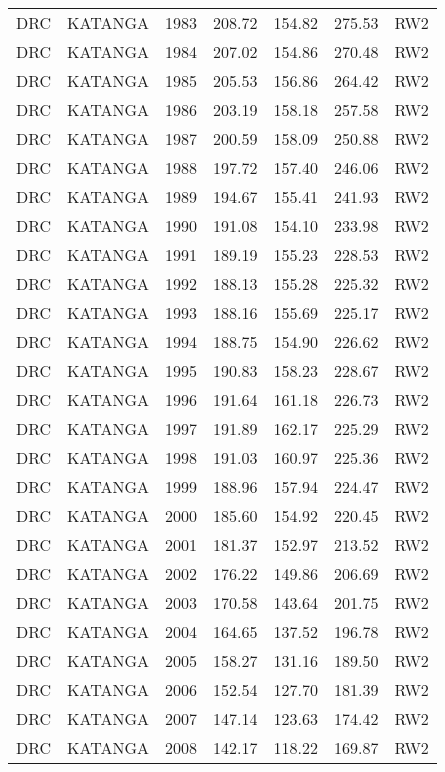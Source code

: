 \begin{longtable}{lllrrrl}
  DRC & KATANGA & 1983 & 208.72 & 154.82 & 275.53 & RW2 \\ 
  DRC & KATANGA & 1984 & 207.02 & 154.86 & 270.48 & RW2 \\ 
  DRC & KATANGA & 1985 & 205.53 & 156.86 & 264.42 & RW2 \\ 
  DRC & KATANGA & 1986 & 203.19 & 158.18 & 257.58 & RW2 \\ 
  DRC & KATANGA & 1987 & 200.59 & 158.09 & 250.88 & RW2 \\ 
  DRC & KATANGA & 1988 & 197.72 & 157.40 & 246.06 & RW2 \\ 
  DRC & KATANGA & 1989 & 194.67 & 155.41 & 241.93 & RW2 \\ 
  DRC & KATANGA & 1990 & 191.08 & 154.10 & 233.98 & RW2 \\ 
  DRC & KATANGA & 1991 & 189.19 & 155.23 & 228.53 & RW2 \\ 
  DRC & KATANGA & 1992 & 188.13 & 155.28 & 225.32 & RW2 \\ 
  DRC & KATANGA & 1993 & 188.16 & 155.69 & 225.17 & RW2 \\ 
  DRC & KATANGA & 1994 & 188.75 & 154.90 & 226.62 & RW2 \\ 
  DRC & KATANGA & 1995 & 190.83 & 158.23 & 228.67 & RW2 \\ 
  DRC & KATANGA & 1996 & 191.64 & 161.18 & 226.73 & RW2 \\ 
  DRC & KATANGA & 1997 & 191.89 & 162.17 & 225.29 & RW2 \\ 
  DRC & KATANGA & 1998 & 191.03 & 160.97 & 225.36 & RW2 \\ 
  DRC & KATANGA & 1999 & 188.96 & 157.94 & 224.47 & RW2 \\ 
  DRC & KATANGA & 2000 & 185.60 & 154.92 & 220.45 & RW2 \\ 
  DRC & KATANGA & 2001 & 181.37 & 152.97 & 213.52 & RW2 \\ 
  DRC & KATANGA & 2002 & 176.22 & 149.86 & 206.69 & RW2 \\ 
  DRC & KATANGA & 2003 & 170.58 & 143.64 & 201.75 & RW2 \\ 
  DRC & KATANGA & 2004 & 164.65 & 137.52 & 196.78 & RW2 \\ 
  DRC & KATANGA & 2005 & 158.27 & 131.16 & 189.50 & RW2 \\ 
  DRC & KATANGA & 2006 & 152.54 & 127.70 & 181.39 & RW2 \\ 
  DRC & KATANGA & 2007 & 147.14 & 123.63 & 174.42 & RW2 \\ 
  DRC & KATANGA & 2008 & 142.17 & 118.22 & 169.87 & RW2 \\ 

\end{longtable}
